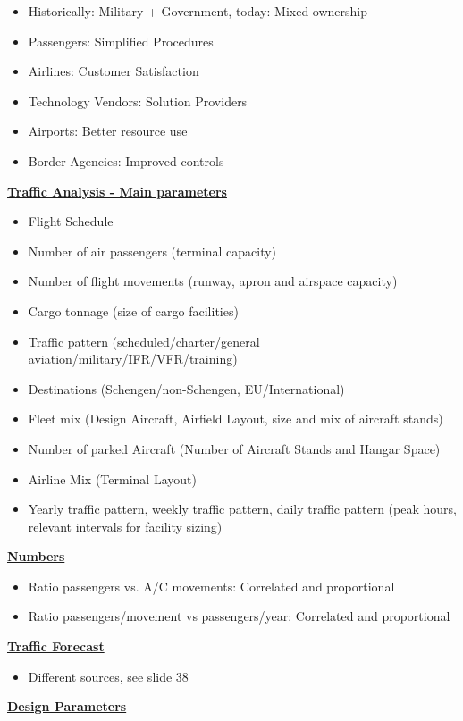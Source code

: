 \documentclass[9pt, landscape, fleqn]{scrartcl}
\begin{document}
\begin{multicols*}{3}
\begin{itemize}
    \item Historically: Military + Government, today: Mixed ownership 
    \item Passengers: Simplified Procedures
    \item Airlines: Customer Satisfaction 
    \item Technology Vendors: Solution Providers 
    \item Airports: Better resource use 
    \item Border Agencies: Improved controls 
\end{itemize}
\underline{\textbf{Traffic Analysis - Main parameters}}
\begin{itemize}
    \item Flight Schedule 
    \item Number of air passengers (terminal capacity)
    \item Number of flight movements (runway, apron and airspace capacity)
    \item Cargo tonnage (size of cargo facilities)
    \item Traffic pattern (scheduled/charter/general aviation/military/IFR/VFR/training)
    \item Destinations (Schengen/non-Schengen, EU/International)
    \item Fleet mix (Design Aircraft, Airfield Layout, size and mix of aircraft stands)
    \item Number of parked Aircraft (Number of Aircraft Stands and Hangar Space)
    \item Airline Mix (Terminal Layout)
    \item Yearly traffic pattern, weekly traffic pattern, daily traffic pattern (peak hours, relevant intervals for facility sizing)
\end{itemize}
\underline{\textbf{Numbers}}
\begin{itemize}
    \item Ratio passengers vs. A/C movements: Correlated and proportional
    \item Ratio passengers/movement vs passengers/year: Correlated and proportional 
\end{itemize}
\underline{\textbf{Traffic Forecast}}
\begin{itemize}
    \item Different sources, see slide 38
\end{itemize}
\underline{\textbf{Design Parameters}}
\begin{itemize}

\end{itemize}
\end{multicols*}
\end{document}
